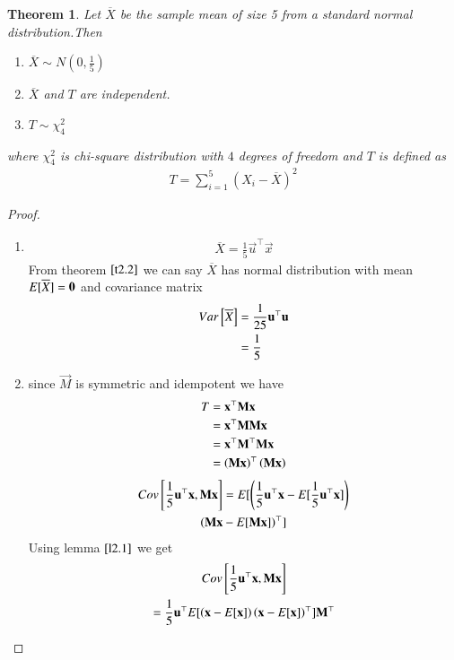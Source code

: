 \documentclass[journal,12pt,twocolumn]{IEEEtran}
\newtheorem{theorem}{Theorem}[section]
\begin{document}
\begin{theorem}
Let $\overline{X}$ be the sample mean of size 5 from a standard normal distribution.Then
\begin{enumerate}
    \item $\overline{X} \sim N(0,\frac{1}{5})$
    \item $\overline{X}$ and $T$ are independent.
    \item $T \sim \chi_{4}^2$
\end{enumerate} 
where $\chi_{4}^2$  is  chi-square distribution
with   $4$ degrees of freedom and $T$ is defined as
\begin{align}
    T=\sum_{i=1}^{5}(X_i-\overline{X})^2
\end{align}
\end{theorem}
\begin{proof}
\begin{enumerate}
\item 
\begin{align}
    \overline{X}=\frac{1}{5}\vec{u}^{\top}\vec{x}\label{3.1}
\end{align}
From theorem $\ref{t2.2}$ we can say $\overline{X}$ has normal distribution with mean $E[ \overline{X} ]=\mathbf{0}$ and covariance matrix
\begin{align}
    Var{}\left[\overline{X}\right]&=\frac{1}{25}\mathbf{u}^{\top}\mathbf{u}\\
    &=\frac{1}{5}
\end{align}
\item since $\vec{M}$ is symmetric and idempotent we have
\begin{align}
   T&=\mathbf{x}^{\top}\mathbf{M}\mathbf{x}\\
    &=\mathbf{x}^{\top}\mathbf{M}\mathbf{M}\mathbf{x}\\
    &=\mathbf{x}^{\top}\mathbf{M}^{\top}\mathbf{M}\mathbf{x}\\
    &=\left(\mathbf{M}\mathbf{x}\right)^{\top}\left(\mathbf{M}\mathbf{x}\right)\label{3.5} 
\end{align}
\begin{multline}
    Cov{}\left[\frac{1}{5}\mathbf{u}^{\top}\mathbf{x},\mathbf{M}\mathbf{x}\right]=E[ \left(\frac{1}{5}\mathbf{u}^{\top}\mathbf{x}-E[ \frac{1}{5}\mathbf{u}^{\top}\mathbf{x} ]\right)\\\left(\mathbf{M}\mathbf{x}-E[ \mathbf{M}\mathbf{x} ]\right)^{\top} ]
\end{multline}
Using lemma $\ref{l2.1}$ we get
\begin{multline}
  Cov\sbrak{\frac{1}{5}\vec{u}^{\top}\vec{x},\vec{M}\vec{x}}\\=\frac{1}{5}\vec{u}^{\top}\mean{\brak{\vec{x}-\mean{\vec{x}}}\brak{\vec{x}-\mean{\vec{x}}}^{\top}}\vec{M}^{\top}  

\end{multline}
\end{enumerate}
\end{proof}
\end{document}
